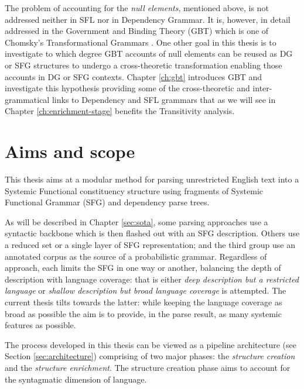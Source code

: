 The problem of accounting for the \textit{null elements}, mentioned above, is not addressed neither in SFL nor in Dependency Grammar. It is, however, in detail addressed in the Government and Binding Theory (GBT) \citep{Chomsky81,Haegeman1991} which is one of Chomsky's Transformational Grammars \citep{Chomsky1957}. One other goal in this thesis is to investigate to which degree GBT accounts of null elements can be reused as DG or SFG structures to undergo a cross-theoretic transformation enabling those accounts in DG or SFG contexts. Chapter \ref{ch:gbt} introduces GBT and investigate this hypothesis providing some of the cross-theoretic and inter-grammatical links to Dependency and SFL grammars that as we will see in Chapter \ref{ch:enrichment-stage} benefits the Transitivity analysis.


\section{Aims and scope}
\label{sec:solution}

This thesis aims at a modular method for parsing unrestricted English text into a Systemic Functional constituency structure using fragments of Systemic Functional Grammar (SFG) and dependency parse trees.

As will be described in Chapter \ref{sec:sota}, some parsing approaches use a syntactic backbone which is then flashed out with an SFG description. Others use a reduced set or a single layer of SFG representation; and the third group use an annotated corpus as the source of a probabilistic grammar. Regardless of approach, each limits the SFG in one way or another, balancing the depth of description with language coverage: that is either \textit{deep description but a restricted language} or \textit{shallow description but broad language coverage} is attempted. The current thesis tilts towards the latter: while keeping the language coverage as broad as possible the aim is to provide, in the parse result, as many systemic features as possible.

The process developed in this thesis can be viewed as a pipeline architecture (see Section \ref{sec:architecture}) comprising of two major phases: the \textit{structure creation} and the \textit{structure enrichment}. The structure creation phase aims to account for the syntagmatic dimension of language. 

